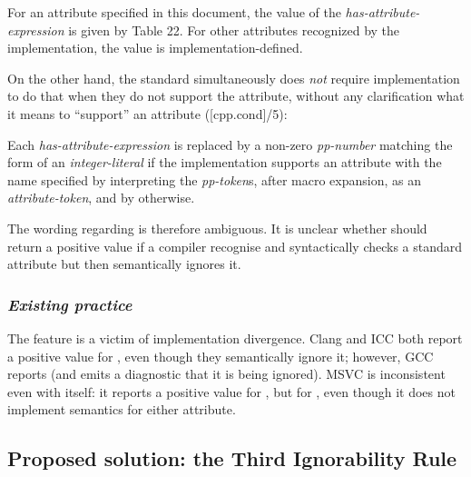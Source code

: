 \begin{adjustwidth}{0.5cm}{0.5cm}
For an attribute specified in this document, the value of the \emph{has-attribute-expression} is given by Table 22. For other attributes recognized by the implementation, the value is implementation-defined.
\end{adjustwidth}

On the other hand, the standard simultaneously does \emph{not} require implementation to do that when they do not support the attribute, without any clarification what it means to ``support'' an attribute ([cpp.cond]/5):

\begin{adjustwidth}{0.5cm}{0.5cm}
Each \emph{has-attribute-expression} is replaced by a non-zero \emph{pp-number} matching the form of an \emph{integer-literal} if the implementation supports an attribute with the name specified by interpreting the \emph{pp-token}s, after macro expansion, as an \emph{attribute-token}, and by  otherwise.
\end{adjustwidth}

The wording regarding \mbox{} is therefore ambiguous. It is unclear whether \mbox{} should return a positive value if a compiler recognise and syntactically checks a standard attribute but then semantically ignores it. 

\subsubsection*{\emph{Existing practice}}

The \mbox{} feature is a victim of implementation divergence. Clang and ICC both report a positive value for \mbox{}, even though they semantically ignore it; however, GCC reports  (and emits a diagnostic that it is being ignored). MSVC is inconsistent even with itself: it reports a positive value for \mbox{}, but  for \mbox{}, even though it does not implement semantics for either attribute.

\subsection{Proposed solution: the Third Ignorability Rule}


